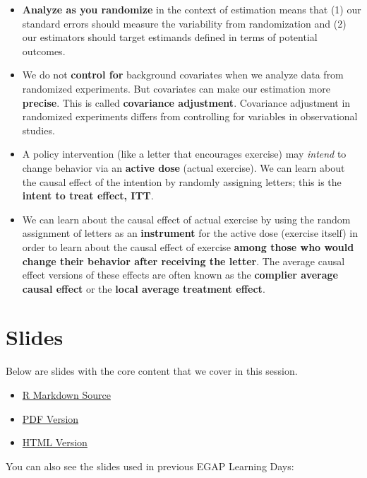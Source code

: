 \documentclass[12pt,]{book}
\begin{document}
\begin{itemize}
\item
  \textbf{Analyze as you randomize} in the context of estimation means that (1) our standard errors should measure the variability from randomization and (2) our estimators should target estimands defined in terms of potential outcomes.
\item
  We do not \textbf{control for} background covariates when we analyze data from randomized experiments. But covariates can make our estimation more \textbf{precise}. This is called \textbf{covariance adjustment}. Covariance adjustment in randomized experiments differs from controlling for variables in observational studies.
\item
  A policy intervention (like a letter that encourages exercise) may \emph{intend} to change behavior via an \textbf{active dose} (actual exercise). We can learn about the causal effect of the intention by randomly assigning letters; this is the \textbf{intent to treat effect, ITT}.
\item
  We can learn about the causal effect of actual exercise by using the random assignment of letters as an \textbf{instrument} for the active dose (exercise itself) in order to learn about the causal effect of exercise \textbf{among those who would change their behavior after receiving the letter}. The average causal effect versions of these effects are often known as the \textbf{complier average causal effect} or the \textbf{local average treatment effect}.
\end{itemize}

\hypertarget{slides-4}{%
\section{Slides}\label{slides-4}}

Below are slides with the core content that we cover in this session.

\begin{itemize}
\item
  \href{https://egap.github.io/learningdays-resources/Slides/estimation-slides.Rmd}{R Markdown Source}
\item
  \href{https://egap.github.io/learningdays-resources/Slides/estimation-slides.pdf}{PDF Version}
\item
  \href{https://egap.github.io/learningdays-resources/Slides/estimation-slides.html}{HTML Version}
\end{itemize}

You can also see the slides used in previous EGAP Learning Days:
\end{document}
